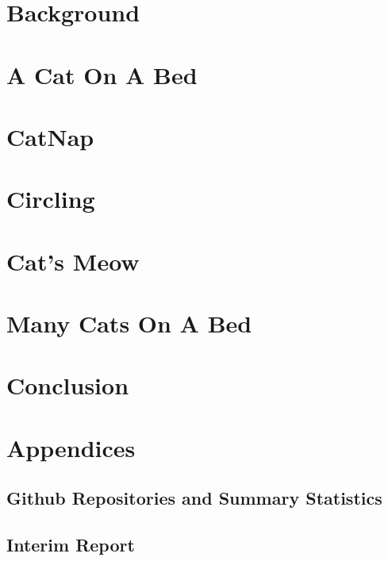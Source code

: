 \documentclass[12pt]{article}
\begin{document}
\section{Background}

\newpage
\section{A Cat On A Bed}
 
\newpage
\section{CatNap}

\newpage
\section{Circling}

\newpage
\section{Cat's Meow}

\newpage
\section{Many Cats On A Bed}

\newpage
\section{Conclusion}




\newpage


\newpage 
\appendix
\section{Appendices}
\subsection{Github Repositories and Summary Statistics}

\newpage
\subsection{Interim Report}

\end{document}
